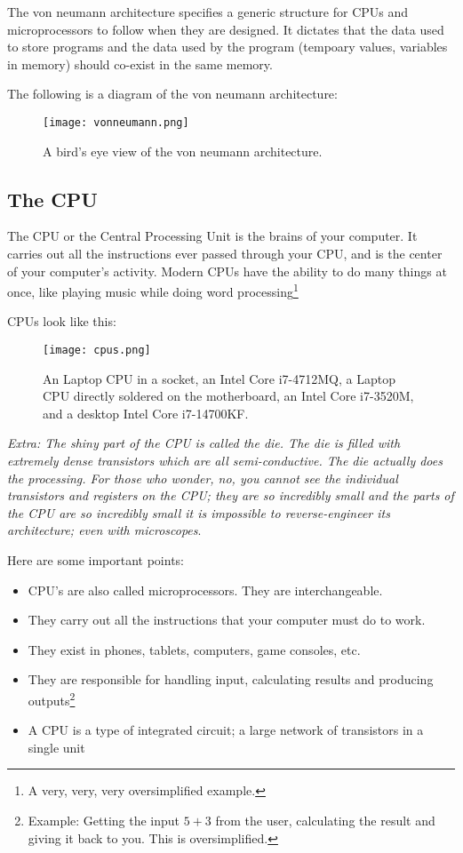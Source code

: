\documentclass[../main.tex]{subfiles}
\begin{document}
\label{3:sec:vonneumann}

The von neumann architecture specifies a generic structure for CPUs and microprocessors to follow when they are designed. It dictates that the data used to store programs and the data used by the program (tempoary values, variables in memory) should co-exist in the same memory.

The following is a diagram of the von neumann architecture:

\begin{figure}[H]
    \centering
    \texttt{[image: vonneumann.png]}
    \caption{A bird's eye view of the von neumann architecture.}
    \label{fig:vonneumann}
\end{figure}

\subsection{The CPU}
\label{3:sec:cpu}

The CPU or the Central Processing Unit is the brains of your computer. It carries out all the instructions ever passed through your CPU, and is the center of your computer's activity. Modern CPUs have the ability to do many things at once, like playing music while doing word processing\footnote{A very, very, very oversimplified example.}

CPUs look like this:

\begin{figure}[H]
    \centering
    \texttt{[image: cpus.png]}
    \caption{An Laptop CPU in a socket, an Intel Core i7-4712MQ, a Laptop CPU directly soldered on the motherboard, an Intel Core i7-3520M, and a desktop Intel Core i7-14700KF.}
    \label{fig:cpus}
\end{figure}

\emph{Extra: The shiny part of the CPU is called the die. The die is filled with extremely dense transistors which are all semi-conductive. The die actually does the processing. For those who wonder, no, you cannot see the individual transistors and registers on the CPU; they are so incredibly small and the parts of the CPU are so incredibly small it is impossible to reverse-engineer its architecture; even with microscopes}.

Here are some important points:

\begin{itemize}
    \item CPU's are also called microprocessors. They are interchangeable.
    \item They carry out all the instructions that your computer must do to work.
    \item They exist in phones, tablets, computers, game consoles, etc.
    \item They are responsible for handling input, calculating results and producing outputs\footnote{Example: Getting the input $5+3$ from the user, calculating the result and giving it back to you. This is oversimplified.}
    \item A CPU is a type of integrated circuit; a large network of transistors in a single unit
\end{itemize}
\end{document}
